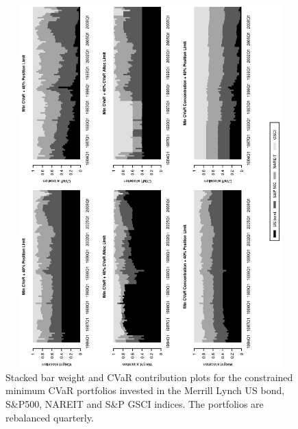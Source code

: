 \documentclass[12pt,a4paper]{article}
\begin{document}
\begin{figure}[tb]
\caption{Stacked bar weight and CVaR contribution plots for the constrained minimum CVaR portfolios invested in the Merrill Lynch US bond, S\&P500, NAREIT and S\&P GSCI indices. The portfolios are rebalanced quarterly.\label{fig:MinCVaR_alternatives}}
\includegraphics[width=12cm,height=14cm,angle=270]{MinCVaR_alternatives_CC.eps}
\end{figure}
\end{document}
